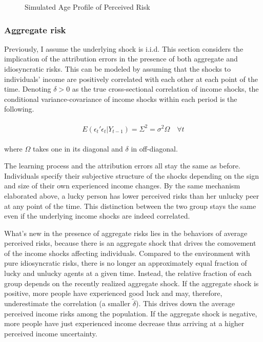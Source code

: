 \documentclass[12pt,notitlepage,onecolumn,aps,pra]{article}
\begin{document}
    \begin{figure*}[!ht]
        \begin{center}\end{center}
        \caption{Simulated Age Profile of Perceived Risk}
        \label{fig:var_age_sim}
    \end{figure*}
    
    \hypertarget{aggregate-risk}{%
\subsubsection{Aggregate risk}\label{aggregate-risk}}

Previously, I assume the underlying shock is i.i.d. This section
considers the implication of the attribution errors in the presence of
both aggregate and idiosyncratic risks. This can be modeled by assuming
that the shocks to individuals' income are positively correlated with
each other at each point of the time. Denoting \(\delta>0\) as the true
cross-sectional correlation of income shocks, the conditional
variance-covariance of income shocks within each period is the
following.

\begin{eqnarray}
\begin{split}
E(\epsilon_{t}'\epsilon_{t}|Y_{t-1}) = \Sigma^2 = \sigma^2\Omega \quad \forall t  
\end{split}
\end{eqnarray}

where \(\Omega\) takes one in its diagonal and \(\delta\) in
off-diagonal.

The learning process and the attribution errors all stay the same as
before. Individuals specify their subjective structure of the shocks
depending on the sign and size of their own experienced income changes.
By the same mechanism elaborated above, a lucky person has lower
perceived risks than her unlucky peer at any point of the time. This
distinction between the two group stays the same even if the underlying
income shocks are indeed correlated.

What's new in the presence of aggregate risks lies in the behaviors of
average perceived risks, because there is an aggregate shock that drives
the comovement of the income shocks affecting individuals. Compared to
the environment with pure idiosyncratic risks, there is no longer an
approximately equal fraction of lucky and unlucky agents at a given
time. Instead, the relative fraction of each group depends on the
recently realized aggregate shock. If the aggregate shock is positive,
more people have experienced good luck and may, therefore, underestimate
the correlation (a smaller \(\tilde \delta\)). This drives down the
average perceived income risks among the population. If the aggregate
shock is negative, more people have just experienced income decrease
thus arriving at a higher perceived income uncertainty.
\end{document}
